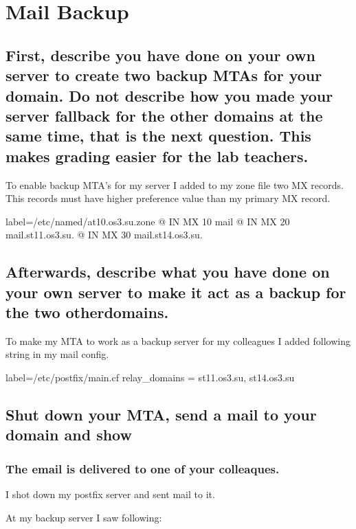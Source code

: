 \documentclass[a4paper,11pt]{article}
\begin{document}
\section{Mail Backup}
\addtocounter{subsection}{3}
\subsection{First, describe you have done on your own server to create two backup MTAs for your domain. Do not describe how you made your server fallback for the other domains at the same time, that is the next question. This makes grading easier for the lab teachers.}
To enable backup MTA's for my server I added to my zone file two MX records. This records must have higher preference value than my primary MX record.

\begin{bashcode*}{label=/etc/named/at10.os3.su.zone}
@       IN  MX  10  mail
@       IN  MX  20  mail.st11.os3.su.
@       IN  MX  30  mail.st14.os3.su.
\end{bashcode*}

\subsection{Afterwards, describe what you have done on your own server to make it act as a backup for the two otherdomains.}

To make my MTA to work as a backup server for my colleagues I added following string in my mail config.

\begin{bashcode*}{label=/etc/postfix/main.cf}
relay_domains = st11.os3.su, st14.os3.su
\end{bashcode*}

\subsection{Shut down your MTA, send a mail to your domain and show}
\subsubsection{The email is delivered to one of your colleaques.}
I shot down my postfix server and sent mail to it.

At my backup server I saw following:

\end{document}
